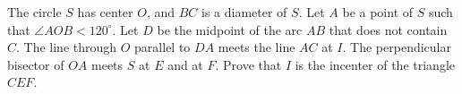 The circle $S$ has center $O$, and $BC$ is a diameter of $S$. Let $A$ be a point of $S$ such that $\angle AOB < 120^\circ$. Let $D$ be the midpoint of the arc $AB$ that does not contain $C$. The line through $O$ parallel to $DA$ meets the line $AC$ at $I$. The perpendicular bisector of $OA$ meets $S$ at $E$ and at $F$. Prove that $I$ is the incenter of the triangle $CEF$.
